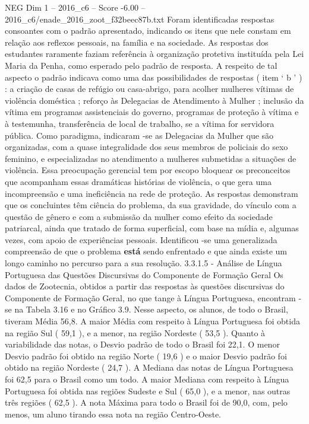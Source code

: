 \begin{textsample}{NEG Dim 1 – 2016\_c6 – Score -6.00 – 2016\_c6/enade\_2016\_zoot\_f32beec87b.txt}
Foram identificadas respostas consoantes com o padrão apresentado, indicando os itens que nele constam em relação aos reflexos pessoais, na família e na sociedade.
As respostas dos estudantes raramente faziam referência à organização protetiva instituída pela Lei Maria da Penha, como esperado pelo padrão de resposta.
A respeito de tal aspecto o padrão indicava como uma das possibilidades de respostas ( item ‘ b ’ ) : a criação de casas de refúgio ou casa-abrigo, para acolher mulheres vítimas de violência doméstica ; reforço às Delegacias de Atendimento à Mulher ; inclusão da vítima em programas assistenciais do governo, programas de proteção à vítima e à testemunha, transferência de local de trabalho, se a vítima for servidora pública.
Como paradigma, indicaram -se as Delegacias da Mulher que são organizadas, com a quase integralidade dos seus membros de policiais do sexo feminino, e especializadas no atendimento a mulheres submetidas a situações de violência.
Essa preocupação gerencial tem por escopo bloquear os preconceitos que acompanham essas dramáticas histórias de violência, o que gera uma incompreensão e uma ineficiência na rede de proteção.
As respostas demonstram que os concluintes têm ciência do problema, da sua gravidade, do vínculo com a questão de gênero e com a submissão da mulher como efeito da sociedade patriarcal, ainda que tratado de forma superficial, com base na mídia e, algumas vezes, com apoio de experiências pessoais.
Identificou -se uma generalizada compreensão de que o problema \textbf{está} sendo enfrentado e que ainda existe um longo caminho no percurso para a sua resolução. 3.3.1.5 - Análise de Língua Portuguesa das Questões Discursivas do Componente de Formação Geral Os dados de Zootecnia, obtidos a partir das respostas às questões discursivas do Componente de Formação Geral, no que tange à Língua Portuguesa, encontram -se na Tabela 3.16 e no Gráfico 3.9.
Nesse aspecto, os alunos, de todo o Brasil, tiveram Média 56,8.
A maior Média com respeito à Língua Portuguesa foi obtida na região Sul ( 59,1 ), e a menor, na região Nordeste ( 53,5 ).
Quanto à variabilidade das notas, o Desvio padrão de todo o Brasil foi 22,1.
O menor Desvio padrão foi obtido na região Norte ( 19,6 ) e o maior Desvio padrão foi obtido na região Nordeste ( 24,7 ).
A Mediana das notas de Língua Portuguesa foi 62,5 para o Brasil como um todo.
A maior Mediana com respeito à Língua Portuguesa foi obtida nas regiões Sudeste e Sul ( 65,0 ), e a menor, nas outras três regiões ( 62,5 ).
A nota Máxima para todo o Brasil foi de 90,0, com, pelo menos, um aluno tirando essa nota na região Centro-Oeste.

\end{textsample}
